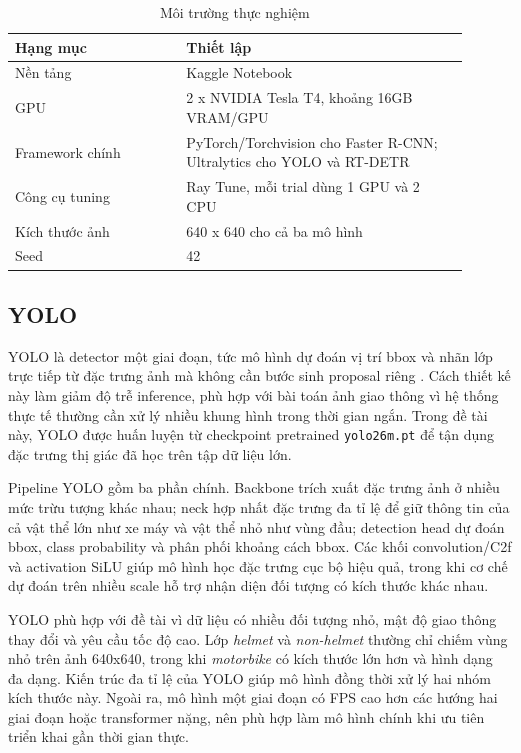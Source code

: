 \begin{table}[H]
    \centering
    \caption{Môi trường thực nghiệm}
    \label{tab:experiment-env}
    \begin{tabular}{@{}p{0.34\linewidth} p{0.56\linewidth}@{}}
        \toprule
        \textbf{Hạng mục} & \textbf{Thiết lập} \\
        \midrule
        Nền tảng & Kaggle Notebook \\
        GPU & 2 x NVIDIA Tesla T4, khoảng 16GB VRAM/GPU \\
        Framework chính & PyTorch/Torchvision cho Faster R-CNN; Ultralytics cho YOLO và RT-DETR \\
        Công cụ tuning & Ray Tune, mỗi trial dùng 1 GPU và 2 CPU \\
        Kích thước ảnh & 640 x 640 cho cả ba mô hình \\
        Seed & 42 \\
        \bottomrule
    \end{tabular}
\end{table}

\subsection{YOLO}

YOLO là detector một giai đoạn, tức mô hình dự đoán vị trí bbox và nhãn lớp trực tiếp từ đặc trưng ảnh mà không cần bước sinh proposal riêng \cite{redmon2016you}. Cách thiết kế này làm giảm độ trễ inference, phù hợp với bài toán ảnh giao thông vì hệ thống thực tế thường cần xử lý nhiều khung hình trong thời gian ngắn. Trong đề tài này, YOLO được huấn luyện từ checkpoint pretrained \texttt{yolo26m.pt} để tận dụng đặc trưng thị giác đã học trên tập dữ liệu lớn.

Pipeline YOLO gồm ba phần chính. Backbone trích xuất đặc trưng ảnh ở nhiều mức trừu tượng khác nhau; neck hợp nhất đặc trưng đa tỉ lệ để giữ thông tin của cả vật thể lớn như xe máy và vật thể nhỏ như vùng đầu; detection head dự đoán bbox, class probability và phân phối khoảng cách bbox. Các khối convolution/C2f và activation SiLU giúp mô hình học đặc trưng cục bộ hiệu quả, trong khi cơ chế dự đoán trên nhiều scale hỗ trợ nhận diện đối tượng có kích thước khác nhau.

YOLO phù hợp với đề tài vì dữ liệu có nhiều đối tượng nhỏ, mật độ giao thông thay đổi và yêu cầu tốc độ cao. Lớp \textit{helmet} và \textit{non-helmet} thường chỉ chiếm vùng nhỏ trên ảnh 640x640, trong khi \textit{motorbike} có kích thước lớn hơn và hình dạng đa dạng. Kiến trúc đa tỉ lệ của YOLO giúp mô hình đồng thời xử lý hai nhóm kích thước này. Ngoài ra, mô hình một giai đoạn có FPS cao hơn các hướng hai giai đoạn hoặc transformer nặng, nên phù hợp làm mô hình chính khi ưu tiên triển khai gần thời gian thực.

